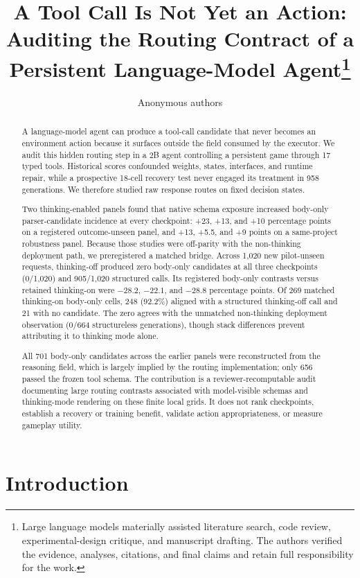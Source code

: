 \documentclass[10pt]{article}
\title{A Tool Call Is Not Yet an Action: Auditing the Routing Contract of a
Persistent Language-Model Agent\thanks{Large language models materially assisted literature
search, code review, experimental-design critique, and manuscript drafting.
The authors verified the evidence, analyses, citations, and final claims and
retain full responsibility for the work.}}
\author{\ArchiveAuthorBlock}
\author{Anonymous authors}
\begin{document}
\maketitle

\begin{abstract}
A language-model agent can produce a tool-call candidate that never becomes an
environment action because it surfaces outside the field consumed by the
executor. We audit this hidden routing step in a 2B agent controlling a
persistent game through 17 typed tools. Historical scores confounded weights,
states, interfaces, and runtime repair, while a prospective 18-cell recovery
test never engaged its treatment in 958 generations. We therefore studied raw
response routes on fixed decision states.

Two thinking-enabled panels found that native schema exposure increased
body-only parser-candidate incidence at every checkpoint: +23, +13, and +10
percentage points on a registered outcome-unseen panel, and +13, +5.5, and +9
points on a same-project robustness panel. Because those studies were
off-parity with the non-thinking deployment path, we preregistered a matched
bridge. Across 1,020 new pilot-unseen requests, thinking-off produced zero
body-only candidates at all three checkpoints (0/1,020) and 905/1,020
structured calls. Its registered body-only contrasts versus retained
thinking-on were $-28.2$, $-22.1$, and $-28.8$ percentage points. Of 269
matched thinking-on body-only cells, 248 (92.2\%) aligned with a structured
thinking-off call and 21 with no candidate. The zero agrees with the unmatched
non-thinking deployment observation (0/664 structureless generations), though
stack differences prevent attributing it to thinking mode alone.

All 701 body-only candidates across the earlier panels were reconstructed from
the reasoning field, which is largely implied by the routing implementation;
only 656 passed the frozen tool schema. The contribution is a
reviewer-recomputable audit documenting large routing contrasts associated with
model-visible schemas and thinking-mode rendering on these finite local grids.
It does not rank checkpoints, establish a recovery or training benefit,
validate action appropriateness, or measure gameplay utility.
\end{abstract}

\section{Introduction}
\end{document}
